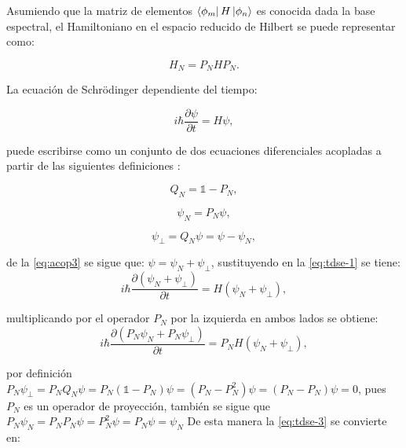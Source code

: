Asumiendo que la matriz de elementos $\bra{\phi_m}H\ket{\phi_n}$ es conocida dada la base espectral, el Hamiltoniano en el espacio reducido de Hilbert se puede representar como:

\begin{equation}
  \label{eq:Hamiltonianored}
  H_N = P_NHP_N.
\end{equation}

La ecuación de Schrödinger dependiente del tiempo:

\begin{equation}
  \label{eq:tdse-1}
  i\hbar\frac{\partial \psi}{\partial t} = H \psi,
\end{equation}

\noindent puede escribirse como un conjunto de dos ecuaciones diferenciales acopladas a partir de las siguientes definiciones \cite{Tannor:2006}:

\begin{equation}
  \label{eq:acop1}
  Q_N = \mathbb{1} - P_N,
\end{equation}

\begin{equation}
  \label{eq:acop2}
  \psi_N = P_N\psi,
\end{equation}

\begin{equation}
  \label{eq:acop3}
  \psi_{\perp}=Q_N\psi = \psi - \psi_{N},
\end{equation}

\noindent de la \autoref{eq:acop3} se sigue que: $\psi = \psi_N + \psi_{\perp}$, sustituyendo en la \autoref{eq:tdse-1} se tiene:
\begin{equation}
  \label{eq:tdse-2}
  i\hbar\frac{\partial (\psi_N + \psi_{\perp})}{\partial t} = H (\psi_N + \psi_{\perp}),
\end{equation}

\noindent multiplicando por el operador $P_N$ por la izquierda en ambos lados se obtiene:
\begin{equation}
   \label{eq:tdse-3}
  i\hbar\frac{\partial (P_N \psi_N + P_N \psi_{\perp})}{\partial t} = P_NH (\psi_N + \psi_{\perp}),
\end{equation}

\noindent por definición $P_N \psi_{\perp}= P_NQ_N\psi = P_N(\mathbb{1}-P_N)\psi = (P_N - P_N^2)\psi = (P_N-P_N)\psi=0$, pues $P_N$ es un operador de proyección, también se sigue que $P_N\psi_N = P_N P_N \psi = P_N^2 \psi = P_N\psi = \psi_N$
De esta manera la \autoref{eq:tdse-3} se convierte en:

